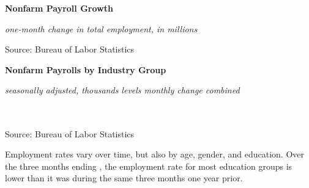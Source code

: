 \documentclass{report}
\newcommand{\tbllink}[1]{\href{https://raw.githubusercontent.com/bdecon/US-chartbook/master/chartbook/data/#1}{\faTable}}
\newcommand{\ctsbar}[5]{
		\addplot[ybar stacked, bar width=#5, draw opacity=0, fill=#1] 
			table [x=#2, y=#3, col sep=comma]{#4};}
\newcommand{\dateaxisticks}{
		date coordinates in=x, axis line style={draw=none},
		xmax={2020-10-01},
		max space between ticks=40,	    
		xtick={{1990-01-01}, {1992-01-01}, {1994-01-01}, 
			{1996-01-01}, {1998-01-01}, {2000-01-01}, 
			{2002-01-01}, {2004-01-01}, {2006-01-01},
			{2008-01-01}, {2010-01-01}, {2012-01-01}, {2014-01-01},
		    {2016-01-01}, {2018-01-01}, {2020-01-01}},
		minor xtick={{1989-01-01}, {1991-01-01}, {1993-01-01},
			{1995-01-01}, {1997-01-01}, {1999-01-01}, 
			{2001-01-01}, {2003-01-01}, {2005-01-01}, {2007-01-01},
		    {2009-01-01}, {2011-01-01}, {2013-01-01}, {2015-01-01},
		    {2017-01-01}, {2019-01-01}},
		enlarge y limits={0.06}, enlarge x limits={0.01},
		}
\newcommand{\bbar}[2]{extra #1 ticks = {{#2}}, extra #1 tick labels = ,
		extra #1 tick style = {grid=major, grid style={thick, black!25}},}
\begin{document}
{{{{{{\begin{minipage}{0.43\textwidth}
\normalsize \textbf{Nonfarm Payroll Growth}

\footnotesize{\textit{one-month change in total employment, in millions}}

\hspace*{-3mm} 

\footnotesize{Source: Bureau of Labor Statistics} \hfill \tbllink{nfp.csv}
\end{minipage}

\vspace{5mm}

\normalsize \textbf{Nonfarm Payrolls by Industry Group}\\
\footnotesize{\textit{seasonally adjusted, thousands \hspace{9mm}levels \hspace{17mm} monthly change \hspace{29mm} combined}\\
\vspace{-5mm}

\hspace*{-3mm} \noindent {} \setlength{\tabcolsep}{3.1pt} \color{black!90}
		{\renewcommand{\arraystretch}{1.55}
		 \begin{tabular}{p{38mm} R{12mm} R{12mm} | R{9.5mm} R{9.5mm} R{9.5mm} 
		   R{10mm} | R{11mm} R{11mm}}
			 \hline
		\end{tabular}
		}	\\
		
\vspace{-2mm}
\footnotesize{Source: Bureau of Labor Statistics} \hspace{9.7cm} \tbllink{ces_data.csv}

\newpage
\begin{minipage}{0.76\textwidth} 
\small Employment rates vary over time, but also by age, gender, and education. Over the three months ending \unskip, the employment rate for most education groups is lower than it was during the same three months one year prior.


\end{minipage}}}}}}}}
\end{document}
